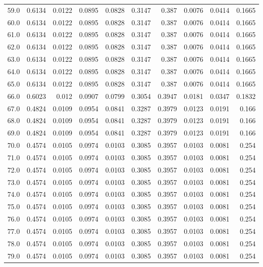 \begin{longtable}{lrrrrrrrrr}
59.0 & 0.6134 & 0.0122 & 0.0895 & 0.0828 & 0.3147 & 0.387 & 0.0076 & 0.0414 & 0.1665 \\
60.0 & 0.6134 & 0.0122 & 0.0895 & 0.0828 & 0.3147 & 0.387 & 0.0076 & 0.0414 & 0.1665 \\
61.0 & 0.6134 & 0.0122 & 0.0895 & 0.0828 & 0.3147 & 0.387 & 0.0076 & 0.0414 & 0.1665 \\
62.0 & 0.6134 & 0.0122 & 0.0895 & 0.0828 & 0.3147 & 0.387 & 0.0076 & 0.0414 & 0.1665 \\
63.0 & 0.6134 & 0.0122 & 0.0895 & 0.0828 & 0.3147 & 0.387 & 0.0076 & 0.0414 & 0.1665 \\
64.0 & 0.6134 & 0.0122 & 0.0895 & 0.0828 & 0.3147 & 0.387 & 0.0076 & 0.0414 & 0.1665 \\
65.0 & 0.6134 & 0.0122 & 0.0895 & 0.0828 & 0.3147 & 0.387 & 0.0076 & 0.0414 & 0.1665 \\
66.0 & 0.6023 & 0.012 & 0.0907 & 0.0799 & 0.3054 & 0.3947 & 0.0181 & 0.0347 & 0.1832 \\
67.0 & 0.4824 & 0.0109 & 0.0954 & 0.0841 & 0.3287 & 0.3979 & 0.0123 & 0.0191 & 0.166 \\
68.0 & 0.4824 & 0.0109 & 0.0954 & 0.0841 & 0.3287 & 0.3979 & 0.0123 & 0.0191 & 0.166 \\
69.0 & 0.4824 & 0.0109 & 0.0954 & 0.0841 & 0.3287 & 0.3979 & 0.0123 & 0.0191 & 0.166 \\
70.0 & 0.4574 & 0.0105 & 0.0974 & 0.0103 & 0.3085 & 0.3957 & 0.0103 & 0.0081 & 0.254 \\
71.0 & 0.4574 & 0.0105 & 0.0974 & 0.0103 & 0.3085 & 0.3957 & 0.0103 & 0.0081 & 0.254 \\
72.0 & 0.4574 & 0.0105 & 0.0974 & 0.0103 & 0.3085 & 0.3957 & 0.0103 & 0.0081 & 0.254 \\
73.0 & 0.4574 & 0.0105 & 0.0974 & 0.0103 & 0.3085 & 0.3957 & 0.0103 & 0.0081 & 0.254 \\
74.0 & 0.4574 & 0.0105 & 0.0974 & 0.0103 & 0.3085 & 0.3957 & 0.0103 & 0.0081 & 0.254 \\
75.0 & 0.4574 & 0.0105 & 0.0974 & 0.0103 & 0.3085 & 0.3957 & 0.0103 & 0.0081 & 0.254 \\
76.0 & 0.4574 & 0.0105 & 0.0974 & 0.0103 & 0.3085 & 0.3957 & 0.0103 & 0.0081 & 0.254 \\
77.0 & 0.4574 & 0.0105 & 0.0974 & 0.0103 & 0.3085 & 0.3957 & 0.0103 & 0.0081 & 0.254 \\
78.0 & 0.4574 & 0.0105 & 0.0974 & 0.0103 & 0.3085 & 0.3957 & 0.0103 & 0.0081 & 0.254 \\
79.0 & 0.4574 & 0.0105 & 0.0974 & 0.0103 & 0.3085 & 0.3957 & 0.0103 & 0.0081 & 0.254 \\

\end{longtable}
